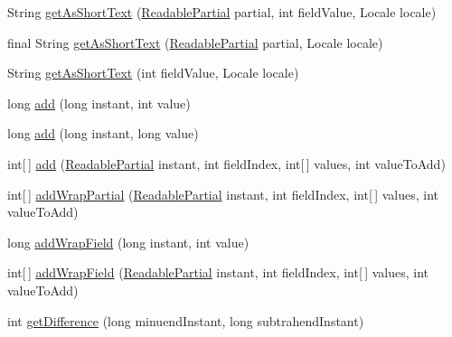 \begin{DoxyCompactItemize}
\item 
String \hyperlink{classorg_1_1joda_1_1time_1_1field_1_1_base_date_time_field_a1e2c0b0404a0974889249004414b06b8}{get\-As\-Short\-Text} (\hyperlink{interfaceorg_1_1joda_1_1time_1_1_readable_partial}{Readable\-Partial} partial, int field\-Value, Locale locale)
\item 
final String \hyperlink{classorg_1_1joda_1_1time_1_1field_1_1_base_date_time_field_a3a46596bccc2acad85768c6c03d00ea1}{get\-As\-Short\-Text} (\hyperlink{interfaceorg_1_1joda_1_1time_1_1_readable_partial}{Readable\-Partial} partial, Locale locale)
\item 
String \hyperlink{classorg_1_1joda_1_1time_1_1field_1_1_base_date_time_field_ad16cf6560e02fd0a9399762b1ebd5530}{get\-As\-Short\-Text} (int field\-Value, Locale locale)
\item 
long \hyperlink{classorg_1_1joda_1_1time_1_1field_1_1_base_date_time_field_a45cd5fea81f2bc65735921f95052069b}{add} (long instant, int value)
\item 
long \hyperlink{classorg_1_1joda_1_1time_1_1field_1_1_base_date_time_field_a6f45aa2157f580c29f0ec7e5d529c952}{add} (long instant, long value)
\item 
int\mbox{[}$\,$\mbox{]} \hyperlink{classorg_1_1joda_1_1time_1_1field_1_1_base_date_time_field_acb2e1fcb88281c1ecada7a59765a1e1c}{add} (\hyperlink{interfaceorg_1_1joda_1_1time_1_1_readable_partial}{Readable\-Partial} instant, int field\-Index, int\mbox{[}$\,$\mbox{]} values, int value\-To\-Add)
\item 
int\mbox{[}$\,$\mbox{]} \hyperlink{classorg_1_1joda_1_1time_1_1field_1_1_base_date_time_field_aa62928afe16523d60dd510810e916f9a}{add\-Wrap\-Partial} (\hyperlink{interfaceorg_1_1joda_1_1time_1_1_readable_partial}{Readable\-Partial} instant, int field\-Index, int\mbox{[}$\,$\mbox{]} values, int value\-To\-Add)
\item 
long \hyperlink{classorg_1_1joda_1_1time_1_1field_1_1_base_date_time_field_a5b34f8821250f63795c4e7952260138c}{add\-Wrap\-Field} (long instant, int value)
\item 
int\mbox{[}$\,$\mbox{]} \hyperlink{classorg_1_1joda_1_1time_1_1field_1_1_base_date_time_field_a51ad3b34b605a111f0c0412e8ad92a11}{add\-Wrap\-Field} (\hyperlink{interfaceorg_1_1joda_1_1time_1_1_readable_partial}{Readable\-Partial} instant, int field\-Index, int\mbox{[}$\,$\mbox{]} values, int value\-To\-Add)
\item 
int \hyperlink{classorg_1_1joda_1_1time_1_1field_1_1_base_date_time_field_a2cbaf43580ad7e1a176d28ae3f5e8ca3}{get\-Difference} (long minuend\-Instant, long subtrahend\-Instant)

\end{DoxyCompactItemize}
